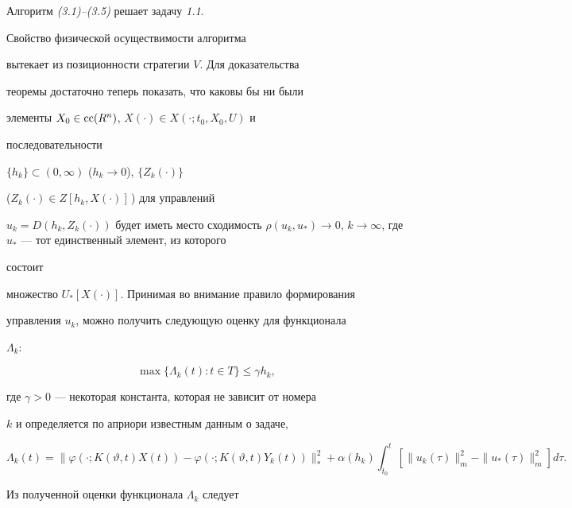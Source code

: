  


\begin{thms} 


Алгоритм {\em (3.1)--(3.5)} решает задачу {\em 1.1}. 


\end{thms} 


 


\begin{pf} Свойство физической осуществимости алгоритма 


вытекает из позиционности стратегии $V$. Для доказательства 


теоремы достаточно теперь показать, что каковы бы ни были 


элементы $X_0\in\operatorname{cc}(R^n)$, $X(\cdot)\in X(\cdot;t_0,X_0,U)$ и 


последовательности 


$\{h_k\}\subset(0,\infty)$ ($h_k\to 0$), $\{Z_k(\cdot)\}$ 


($Z_k(\cdot)\in Z[h_k,X(\cdot)]$\,) для управлений 


$u_k=D(h_k,Z_k(\cdot))$ будет иметь место сходимость $\rho(u_k,u_*)\to 


0$, $k\to\infty$, где $u_*$ --- тот единственный элемент, из которого 


состоит 


множество $U_*[X(\cdot)]$. Принимая во внимание правило формирования 


управления $u_k$, можно получить следующую оценку для функционала 


$\Lambda_k$: 


\begin{equation} 


\max\{\Lambda_k(t):t\in T\}\le\gamma h_k, 


\end{equation} 


где $\gamma>0$ --- некоторая константа, которая не зависит от номера 


$k$ и определяется по априори известным данным о задаче, 


$$ 


\Lambda_k(t)=\|\varphi(\cdot;K(\vartheta,t)X(t))- 


\varphi(\cdot;K(\vartheta,t)Y_k(t))\|^2_*+ 


\alpha(h_k)\int^t_{t_0}[\|u_k(\tau)\|^2_m- 


\|u_*(\tau)\|^2_m]d\tau. 


$$ 


Из полученной оценки функционала $\Lambda_k$ следует



\end{pf}
